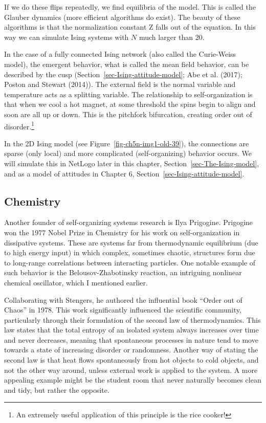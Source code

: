 \documentclass[
  a4paper,
  DIV=11,
  numbers=noendperiod]{scrreprt}
\begin{document}
If we do these flips repeatedly, we find equilibria of the model. This
is called the Glauber dynamics (more efficient algorithms do exist). The
beauty of these algorithms is that the normalization constant Z falls
out of the equation. In this way we can simulate Ising systems with
\(N\) much larger than 20.

In the case of a fully connected Ising network (also called the
Curie-Weiss model), the emergent behavior, what is called the mean field
behavior, can be described by the cusp
(Section~\ref{sec-Ising-attitude-model}; Abe et al. (2017); Poston and
Stewart (2014)). The external field is the normal variable and
temperature acts as a splitting variable. The relationship to
self-organization is that when we cool a hot magnet, at some threshold
the spins begin to align and soon are all up or down. This is the
pitchfork bifurcation, creating order out of disorder.\footnote{An
  extremely useful application of this principle is the rice cooker!}

In the 2D Ising model (see Figure~\ref{fig-ch5n-img1-old-39}), the
connections are sparse (only local) and more complicated
(self-organizing) behavior occurs. We will simulate this in NetLogo
later in this chapter, Section~\ref{sec-The-Ising-model}, and as a model
of attitudes in Chapter 6, Section~\ref{sec-Ising-attitude-model}.

\hypertarget{sec-Chemistry}{%
\subsection{Chemistry}\label{sec-Chemistry}}

Another founder of self-organizing systems research is Ilya Prigogine.
Prigogine won the 1977 Nobel Prize in Chemistry for his work on
self-organization in dissipative systems. These are systems far from
thermodynamic equilibrium (due to high energy input) in which complex,
sometimes chaotic, structures form due to long-range correlations
between interacting particles. One notable example of such behavior is
the Belousov-Zhabotinsky reaction, an intriguing nonlinear chemical
oscillator, which I mentioned earlier.

Collaborating with Stengers, he authored the influential book ``Order
out of Chaos'' in 1978. This work significantly influenced the
scientific community, particularly through their formulation of the
second law of thermodynamics. This law states that the total entropy of
an isolated system always increases over time and never decreases,
meaning that spontaneous processes in nature tend to move towards a
state of increasing disorder or randomness. Another way of stating the
second law is that heat flows spontaneously from hot objects to cold
objects, and not the other way around, unless external work is applied
to the system. A more appealing example might be the student room that
never naturally becomes clean and tidy, but rather the opposite.
\end{document}
